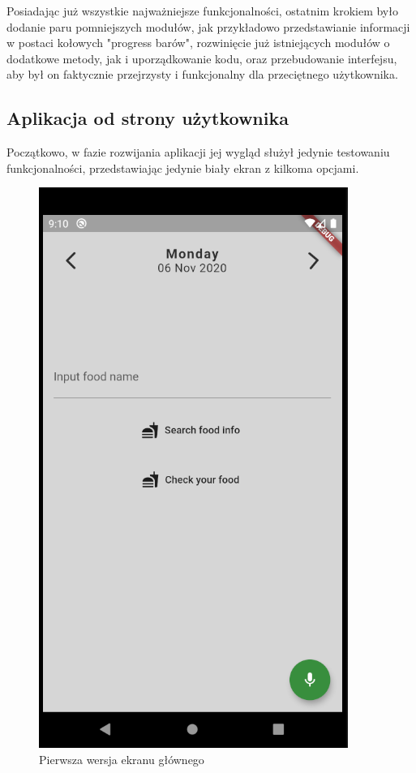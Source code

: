 \documentclass[12pt, a4paper]{article}
\begin{document}
\begin{sloppypar}
{{  Posiadając już wszystkie najważniejsze funkcjonalności, ostatnim krokiem było dodanie paru
  pomniejszych modułów, jak przykładowo przedstawianie informacji w postaci kołowych "progress
  barów", rozwinięcie już istniejących modułów o dodatkowe metody, jak i uporządkowanie kodu, oraz
  przebudowanie interfejsu, aby był on faktycznie przejrzysty i funkcjonalny dla
  przeciętnego użytkownika.
  }

  \subsection{Aplikacja od strony użytkownika}{
    Początkowo, w fazie rozwijania aplikacji jej wygląd służył jedynie testowaniu funkcjonalności,
    przedstawiając jedynie biały ekran z kilkoma opcjami.

    \begin{figure}[H]
      \centering
      \includegraphics[scale=0.85]{screen_home_oldest.PNG}
      \caption{Pierwsza wersja ekranu głównego}
      \label{fig:screen_oldest}
    \end{figure}

}}
\end{sloppypar}
\end{document}
